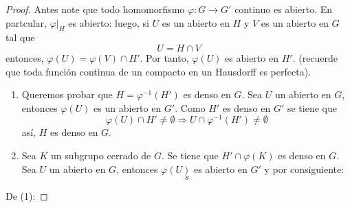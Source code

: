 \documentclass[12pt]{report}
\theoremstyle{largebreak}
\newcommand\cf[3]{\ensuremath{#1:#2\rightarrow#3}}
\begin{document}
    \begin{proof}
        Antes note que todo homomorfismo $\cf{\varphi}{G}{G'}$ continuo es abierto. En partcular, $\varphi\big|_H$ es abierto: luego, si $U$ es un abierto en $H$ y $V$ es un abierto en $G$ tal que
        \begin{equation*}
            U=H\cap V
        \end{equation*}
        entonces, $\varphi(U)=\varphi(V)\cap H'$. Por tanto, $\varphi(U)$ es abierto en $H'$. (recuerde que toda función continua de un compacto en un Hausdorff es perfecta).

        \begin{enumerate}
            \item Queremos probar que $H=\varphi^{-1}(H')$ es denso en $G$. Sea $U$ un abierto en $G$, entonces $\varphi(U)$ es un abierto en $G'$. Como $H'$ es denso en $G'$ se tiene que
            \begin{equation*}
                \varphi(U)\cap H'\neq\emptyset\Rightarrow U\cap\varphi^{-1}(H')\neq\emptyset
            \end{equation*}
            así, $H$ es denso en $G$.
            \item Sea $K$ un subgrupo cerrado de $G$. Se tiene que $H'\cap\varphi(K)$ es denso en $G$. Sea $U$ un abierto en $G$, entonces $\varphi(U)$ es abierto en $G'$ y por consiguiente:
            \begin{equation*}
                s
            \end{equation*}
        \end{enumerate}
        
        De (1): 
    \end{proof}
\end{document}
